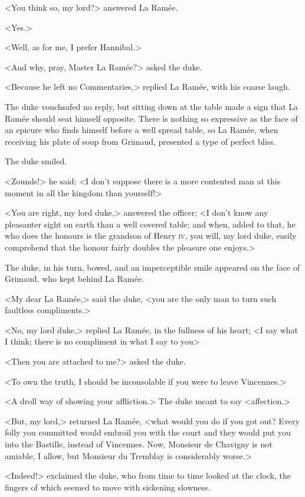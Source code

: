 <You think so, my lord?> answered La Ramée.

<Yes.>

<Well, as for me, I prefer Hannibal.>

<And why, pray, Master La Ramée?> asked the duke.

<Because he left no Commentaries,> replied La Ramée, with his coarse laugh.

The duke vouchsafed no reply, but sitting down at the table made a sign that La Ramée should seat himself opposite. There is nothing so expressive as the face of an epicure who finds himself before a well spread table, so La Ramée, when receiving his plate of soup from Grimaud, presented a type of perfect bliss.

The duke smiled.

<Zounds!> he said; <I don't suppose there is a more contented man at this moment in all the kingdom than yourself!>

<You are right, my lord duke,> answered the officer; <I don't know any pleasanter sight on earth than a well covered table; and when, added to that, he who does the honours is the grandson of Henry \textsc{iv}, you will, my lord duke, easily comprehend that the honour fairly doubles the pleasure one enjoys.>

The duke, in his turn, bowed, and an imperceptible smile appeared on the face of Grimaud, who kept behind La Ramée.

<My dear La Ramée,> said the duke, <you are the only man to turn such faultless compliments.>

<No, my lord duke,> replied La Ramée, in the fullness of his heart; <I say what I think; there is no compliment in what I say to you\longdash>

<Then you are attached to me?> asked the duke.

<To own the truth, I should be inconsolable if you were to leave Vincennes.>

<A droll way of showing your affliction.> The duke meant to say <affection.>

<But, my lord,> returned La Ramée, <what would you do if you got out? Every folly you committed would embroil you with the court and they would put you into the Bastille, instead of Vincennes. Now, Monsieur de Chavigny is not amiable, I allow, but Monsieur du Tremblay is considerably worse.>

<Indeed!> exclaimed the duke, who from time to time looked at the clock, the fingers of which seemed to move with sickening slowness.

